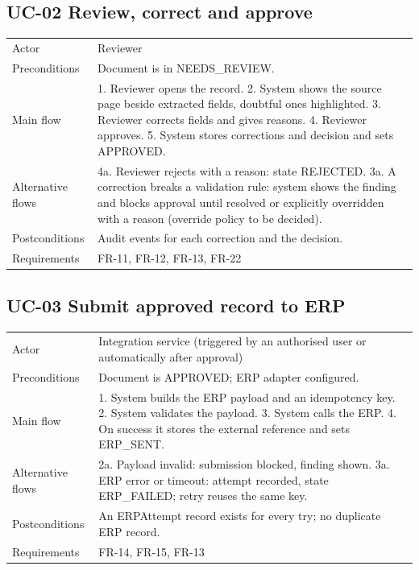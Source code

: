\subsection*{UC-02 Review, correct and approve}
{\tblstart\small
\begin{longtable}{L{3.0cm}L{10.8cm}}
Actor & Reviewer\\
Preconditions & Document is in NEEDS\_REVIEW.\\
Main flow & 1. Reviewer opens the record. 2. System shows the source page beside extracted fields, doubtful ones highlighted. 3. Reviewer corrects fields and gives reasons. 4. Reviewer approves. 5. System stores corrections and decision and sets APPROVED.\\
Alternative flows & 4a. Reviewer rejects with a reason: state REJECTED. 3a. A correction breaks a validation rule: system shows the finding and blocks approval until resolved or explicitly overridden with a reason (override policy to be decided).\\
Postconditions & Audit events for each correction and the decision.\\
Requirements & FR-11, FR-12, FR-13, FR-22\\
\hline
\end{longtable}}

\subsection*{UC-03 Submit approved record to ERP}
{\tblstart\small
\begin{longtable}{L{3.0cm}L{10.8cm}}
Actor & Integration service (triggered by an authorised user or automatically after approval)\\
Preconditions & Document is APPROVED; ERP adapter configured.\\
Main flow & 1. System builds the ERP payload and an idempotency key. 2. System validates the payload. 3. System calls the ERP. 4. On success it stores the external reference and sets ERP\_SENT.\\
Alternative flows & 2a. Payload invalid: submission blocked, finding shown. 3a. ERP error or timeout: attempt recorded, state ERP\_FAILED; retry reuses the same key.\\
Postconditions & An ERPAttempt record exists for every try; no duplicate ERP record.\\
Requirements & FR-14, FR-15, FR-13\\
\hline
\end{longtable}}

